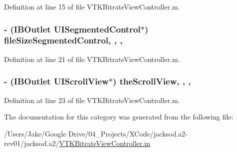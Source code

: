 Definition at line 15 of file V\+T\+K\+Bitrate\+View\+Controller.\+m.

\hypertarget{category_v_t_k_bitrate_view_controller_07_08_a954b77c570cd18a518d9f46a489c800e}{
\subsubsection[{file\+Size\+Segmented\+Control}]{\setlength{\rightskip}{0pt plus 5cm}-\/ (I\+B\+Outlet U\+I\+Segmented\+Control$\ast$) file\+Size\+Segmented\+Control\hspace{0.3cm}{\ttfamily [read]}, {\ttfamily [write]}, {\ttfamily [nonatomic]}, {\ttfamily [weak]}}}\label{category_v_t_k_bitrate_view_controller_07_08_a954b77c570cd18a518d9f46a489c800e}


Definition at line 21 of file V\+T\+K\+Bitrate\+View\+Controller.\+m.

\hypertarget{category_v_t_k_bitrate_view_controller_07_08_abc9eba67908448321fb758b6f1a601f8}{
\subsubsection[{the\+Scroll\+View}]{\setlength{\rightskip}{0pt plus 5cm}-\/ (I\+B\+Outlet U\+I\+Scroll\+View$\ast$) the\+Scroll\+View\hspace{0.3cm}{\ttfamily [read]}, {\ttfamily [write]}, {\ttfamily [nonatomic]}, {\ttfamily [weak]}}}\label{category_v_t_k_bitrate_view_controller_07_08_abc9eba67908448321fb758b6f1a601f8}


Definition at line 23 of file V\+T\+K\+Bitrate\+View\+Controller.\+m.



The documentation for this category was generated from the following file\+:\begin{DoxyCompactItemize}
\item 
/\+Users/\+Jake/\+Google Drive/04\+\_\+\+Projects/\+X\+Code/jacksod.\+a2-\/rev01/jacksod.\+a2/\hyperlink{_v_t_k_bitrate_view_controller_8m}{V\+T\+K\+Bitrate\+View\+Controller.\+m}\end{DoxyCompactItemize}
